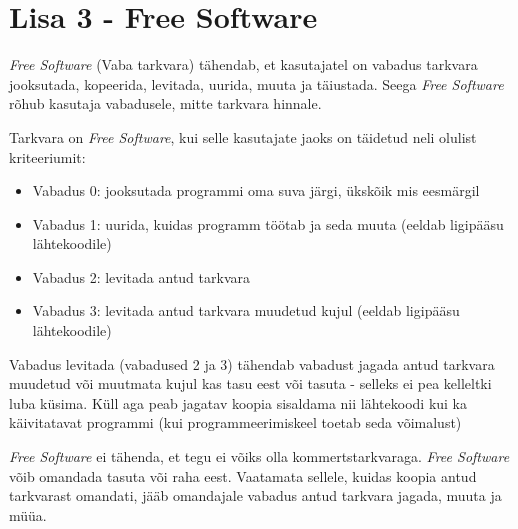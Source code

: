 \documentclass[a4paper,12pt]{article} %
\begin{document}
\section*{Lisa 3 - Free Software}
\label{lisa_free_software}
\textit{Free Software} (Vaba tarkvara) tähendab, et kasutajatel on vabadus tarkvara jooksutada, kopeerida, levitada, uurida, muuta ja täiustada. Seega \textit{Free Software} rõhub kasutaja vabadusele, mitte tarkvara hinnale. \par
Tarkvara on \textit{Free Software}, kui selle kasutajate jaoks on täidetud neli olulist kriteeriumit:
\begin{itemize}
\item Vabadus 0: jooksutada programmi oma suva järgi, ükskõik mis eesmärgil
\item Vabadus 1: uurida, kuidas programm töötab ja seda muuta (eeldab ligipääsu lähtekoodile)
\item Vabadus 2: levitada antud tarkvara
\item Vabadus 3: levitada antud tarkvara muudetud kujul (eeldab ligipääsu lähtekoodile)
\end{itemize}
Vabadus levitada (vabadused 2 ja 3) tähendab vabadust jagada antud tarkvara muudetud või muutmata kujul kas tasu eest või tasuta - selleks ei pea kelleltki luba küsima. Küll aga peab jagatav koopia sisaldama nii lähtekoodi kui ka käivitatavat programmi (kui programmeerimiskeel toetab seda võimalust)\par
\textit{Free Software} ei tähenda, et tegu ei võiks olla kommertstarkvaraga. \textit{Free Software} võib omandada tasuta või raha eest. Vaatamata sellele, kuidas koopia antud tarkvarast omandati,  jääb omandajale vabadus antud tarkvara jagada, muuta ja müüa.
\cite{GNU_Free_SW}
\end{document}
